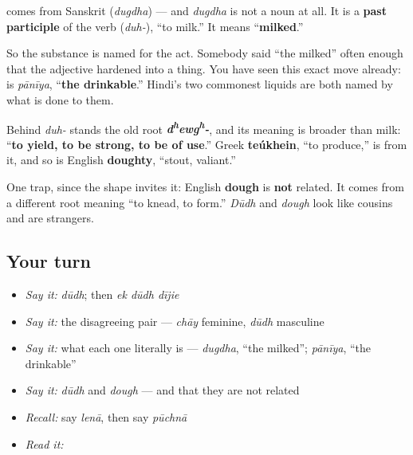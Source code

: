 \begin{cousinweb}
\textbf{} comes from Sanskrit \textbf{} (\emph{dugdha}) — and \emph{dugdha} is not a noun at all. It is a \textbf{past participle} of the verb \textbf{} (\emph{duh-}), \textquotedblleft{}to milk.\textquotedblright{} It means \textquotedblleft{}\textbf{milked}.\textquotedblright{}

So the substance is named for the act. Somebody said \textquotedblleft{}the milked\textquotedblright{} often enough that the adjective hardened into a thing. You have seen this exact move already: \textbf{} is \emph{pānīya}, \textquotedblleft{}\textbf{the drinkable}.\textquotedblright{} Hindi's two commonest liquids are both named by what is done to them.

Behind \emph{duh-} stands the old root \emph{\textbf{d\textsuperscript{h}ewg\textsuperscript{h}-}}, and its meaning is broader than milk: \textquotedblleft{}\textbf{to yield, to be strong, to be of use}.\textquotedblright{} Greek \textbf{teúkhein}, \textquotedblleft{}to produce,\textquotedblright{} is from it, and so is English \textbf{doughty}, \textquotedblleft{}stout, valiant.\textquotedblright{}

One trap, since the shape invites it: English \textbf{dough} is \textbf{not} related. It comes from a different root meaning \textquotedblleft{}to knead, to form.\textquotedblright{} \emph{Dūdh} and \emph{dough} look like cousins and are strangers.
\end{cousinweb}

\subsection*{Your turn}
\begin{itemize}
\raggedright
  \item \emph{Say it:} \emph{dūdh}; then \emph{ek dūdh dījie}
  \item \emph{Say it:} the disagreeing pair — \emph{chāy} feminine, \emph{dūdh} masculine
  \item \emph{Say it:} what each one literally is — \emph{dugdha}, \textquotedblleft{}the milked\textquotedblright{}; \emph{pānīya}, \textquotedblleft{}the drinkable\textquotedblright{}
  \item \emph{Say it:} \emph{dūdh} and \emph{dough} — and that they are not related
  \item \emph{Recall:} say \emph{lenā}, then say \emph{pūchnā}
  \item \emph{Read it:} \textbf{ }
\end{itemize}

